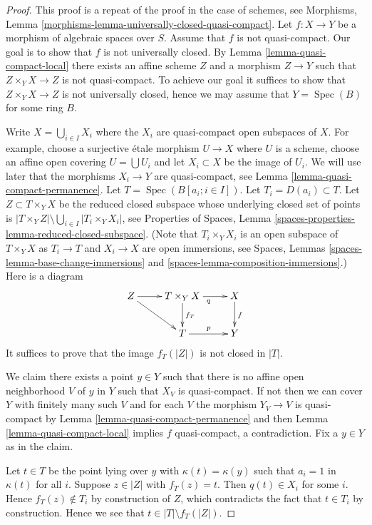 \documentclass[10pt,a4paper]{amsart}
\theoremstyle{plain}
\theoremstyle{definition}
\theoremstyle{remark}
\numberwithin{equation}{subsection}
\def\Spec{\mathop{\mathrm{Spec}}}
\begin{document}
\begin{proof}
This proof is a repeat of the proof in the case of schemes, see
Morphisms, Lemma \ref{morphisms-lemma-universally-closed-quasi-compact}.
Let $f : X \to Y$ be a morphism of algebraic spaces over $S$.
Assume that $f$ is not quasi-compact.
Our goal is to show that $f$ is not universally closed. By
Lemma \ref{lemma-quasi-compact-local}
there exists an affine scheme $Z$ and a morphism $Z \to Y$
such that $Z \times_Y X \to Z$ is not quasi-compact. To achieve our goal
it suffices to show that $Z \times_Y X \to Z$ is not universally closed,
hence we may assume that $Y = \Spec(B)$ for some ring $B$.

\medskip\noindent
Write $X = \bigcup_{i \in I} X_i$ where the $X_i$ are quasi-compact
open subspaces of $X$. For example, choose a surjective \'etale morphism
$U \to X$ where $U$ is a scheme, choose an affine open covering
$U = \bigcup U_i$ and let $X_i \subset X$ be the image of $U_i$.
We will use later that the morphisms $X_i \to Y$ are quasi-compact, see
Lemma \ref{lemma-quasi-compact-permanence}.
Let $T = \Spec(B[a_i ; i \in I])$. Let $T_i = D(a_i) \subset T$.
Let $Z \subset T \times_Y X$ be the reduced closed subspace whose underlying
closed set of points is
$|T \times_Y Z| \setminus \bigcup_{i \in I} |T_i \times_Y X_i|$, see
Properties of Spaces,
Lemma \ref{spaces-properties-lemma-reduced-closed-subspace}.
(Note that $T_i \times_Y X_i$ is an open subspace of $T \times_Y X$ as
$T_i \to T$ and $X_i \to X$ are open immersions, see
Spaces, Lemmas \ref{spaces-lemma-base-change-immersions} and
\ref{spaces-lemma-composition-immersions}.) Here is a diagram
$$
\xymatrix{
Z \ar[r] \ar[rd] &
T \times_Y X \ar[d]^{f_T} \ar[r]_q &
X \ar[d]^f \\
& T \ar[r]^p & Y
}
$$
It suffices to prove that the image $f_T(|Z|)$ is not closed in $|T|$.

\medskip\noindent
We claim there exists a point $y \in Y$ such that there is no
affine open neighborhood $V$ of $y$ in $Y$ such that $X_V$ is quasi-compact.
If not then we can cover $Y$ with finitely many such $V$ and for
each $V$ the morphism $Y_V \to V$ is quasi-compact by
Lemma \ref{lemma-quasi-compact-permanence}
and then
Lemma \ref{lemma-quasi-compact-local}
implies $f$ quasi-compact, a contradiction. Fix a $y \in Y$ as in the claim.

\medskip\noindent
Let $t \in T$ be the point lying over $y$ with $\kappa(t) = \kappa(y)$
such that $a_i = 1$ in $\kappa(t)$ for all $i$. Suppose $z \in |Z|$ with
$f_T(z) = t$. Then $q(t) \in X_i$ for some $i$. Hence $f_T(z) \not \in T_i$
by construction of $Z$, which contradicts the fact that $t \in T_i$ by
construction. Hence we see that $t \in |T| \setminus f_T(|Z|)$.


\end{proof}
\end{document}
